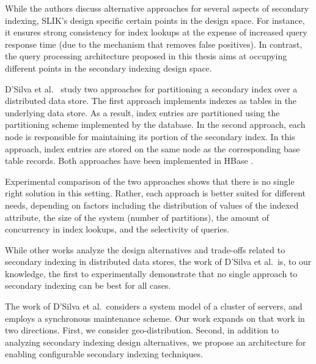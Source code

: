 While the authors discuss alternative approaches for several aspects of secondary indexing,
SLIK's design specific certain points in the design space.
For instance, it ensures strong consistency for index lookups at the expense of increased query response time
(due to the mechanism that removes false positives).
In contrast, the query processing architecture proposed in this thesis aims at occupying different points in the secondary indexing
design space.

\bigskip
\noindent
D'Silva et al.\ \cite{dsilva:tworings} study two approaches for partitioning a secondary index over a distributed data store.
The first approach implements indexes as tables in the underlying data store.
As a result, index entries are partitioned using the partitioning scheme implemented by the database.
In the second approach, each node is responsible for maintaining its portion of the secondary index.
In this approach, index entries are stored on the same node as the corresponding base table records.
Both approaches have been implemented in HBase \cite{hbase:doc}.

Experimental comparison of the two approaches shows that there is no single right solution in this setting.
Rather, each approach is better suited for different needs,
depending on factors including the distribution of values of the indexed attribute,
the size of the system (number of partitions), the amount of concurrency in index lookups,
and the selectivity of queries.

While other works \cite{kejriwal:slik, tan:diffindex} analyze the design alternatives and trade-offs related to secondary
indexing in distributed data stores, the work of D'Silva et al.\ is, to our knowledge, the first to experimentally
demonstrate that no single approach to secondary indexing can be best for all cases.

The work of D'Silva et al.\ considers a system model of a cluster of servers, and employs a synchronous maintenance scheme.
Our work expands on that work in two directions.
First, we consider geo-distribution.
Second, in addition to analyzing secondary indexing design alternatives,
we propose an architecture for enabling configurable secondary indexing techniques.

